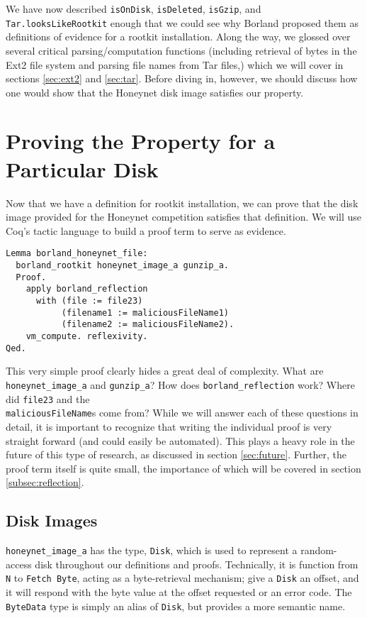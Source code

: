 \documentclass[nocopyrightspace,preprint]{sigplanconf}
\begin{document}
We have now described {\tt isOnDisk}, {\tt isDeleted}, {\tt isGzip}, and {\tt
Tar.looksLikeRootkit} enough that we could see why Borland proposed them as
definitions of evidence for a rootkit installation. Along the way, we glossed
over several critical parsing/computation functions (including retrieval of
bytes in the Ext2 file system and parsing file names from Tar files,) which we
will cover in sections \ref{sec:ext2} and \ref{sec:tar}. Before diving in,
however, we should discuss how one would show that the Honeynet disk image
satisfies our property.

\section{Proving the Property for a Particular Disk}
\label{sec:proving}

Now that we have a definition for rootkit installation, we can prove that the
disk image provided for the Honeynet competition satisfies that definition. We
will use Coq's tactic language to build a proof term to serve as evidence.

\begin{lstlisting}
Lemma borland_honeynet_file:
  borland_rootkit honeynet_image_a gunzip_a.
  Proof.
    apply borland_reflection 
      with (file := file23) 
           (filename1 := maliciousFileName1) 
           (filename2 := maliciousFileName2).
    vm_compute. reflexivity.
Qed.
\end{lstlisting}

This very simple proof clearly hides a great deal of complexity. What are {\tt
honeynet\_image\_a} and {\tt gunzip\_a}? How does {\tt borland\_reflection}
work? Where did {\tt file23} and the \\{\tt maliciousFileName}s come from?
While we will answer each of these questions in detail, it is important to
recognize that writing the individual proof is very straight forward (and
could easily be automated). This plays a heavy role in the future of this type
of research, as discussed in section \ref{sec:future}. Further, the proof term
itself is quite small, the importance of which will be covered in section
\ref{subsec:reflection}.

\subsection{Disk Images}

{\tt honeynet\_image\_a} has the type, {\tt Disk}, which is used to represent
a random-access disk throughout our definitions and proofs.  Technically, it
is function from {\tt N} to {\tt Fetch Byte}, acting as a byte-retrieval
mechanism; give a {\tt Disk} an offset, and it will respond with the byte
value at the offset requested or an error code. The {\tt ByteData} type is
simply an alias of {\tt Disk}, but provides a more semantic name.
\end{document}
